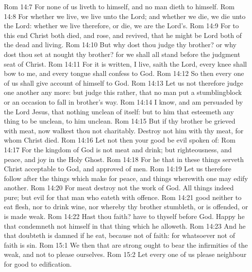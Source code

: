 \vs Rom 14:7 For none of us liveth to himself, and no man dieth to himself.
\vs Rom 14:8 For whether we live, we live unto the Lord; and whether we die, we die unto the Lord: whether we live therefore, or die, we are the Lord's.
\vs Rom 14:9 For to this end Christ both died, and rose, and revived, that he might be Lord both of the dead and living.
\vs Rom 14:10 But why dost thou judge thy brother? or why dost thou set at nought thy brother? for we shall all stand before the judgment seat of Christ.
\vs Rom 14:11 For it is written,  I live, saith the Lord, every knee shall bow to me, and every tongue shall confess to God.
\vs Rom 14:12 So then every one of us shall give account of himself to God.
\vs Rom 14:13 Let us not therefore judge one another any more: but judge this rather, that no man put a stumblingblock or an occasion to fall in  brother's way.
\vs Rom 14:14 I know, and am persuaded by the Lord Jesus, that  nothing unclean of itself: but to him that esteemeth any thing to be unclean, to him  unclean.
\vs Rom 14:15 But if thy brother be grieved with  meat, now walkest thou not charitably. Destroy not him with thy meat, for whom Christ died.
\vs Rom 14:16 Let not then your good be evil spoken of:
\vs Rom 14:17 For the kingdom of God is not meat and drink; but righteousness, and peace, and joy in the Holy Ghost.
\vs Rom 14:18 For he that in these things serveth Christ  acceptable to God, and approved of men.
\vs Rom 14:19 Let us therefore follow after the things which make for peace, and things wherewith one may edify another.
\vs Rom 14:20 For meat destroy not the work of God. All things indeed  pure; but  evil for that man who eateth with offence.
\vs Rom 14:21  good neither to eat flesh, nor to drink wine, nor  whereby thy brother stumbleth, or is offended, or is made weak.
\vs Rom 14:22 Hast thou faith? have  to thyself before God. Happy  he that condemneth not himself in that thing which he alloweth.
\vs Rom 14:23 And he that doubteth is damned if he eat, because  not of faith: for whatsoever  not of faith is sin.
\vs Rom 15:1 We then that are strong ought to bear the infirmities of the weak, and not to please ourselves.
\vs Rom 15:2 Let every one of us please  neighbour for  good to edification.
